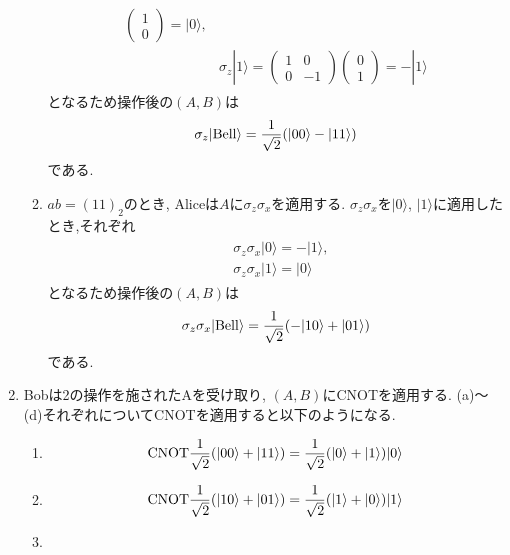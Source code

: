 \documentclass[uplatex,a4j,11pt,dvipdfmx]{jsarticle}
\begin{document}
\begin{enumerate}
\begin{enumerate}
\begin{align}
\begin{split}
\begin{pmatrix}
          1\\0
        \end{pmatrix}=|0\rangle,\\
        &\sigma_z|1\rangle=\begin{pmatrix}
          1&0\\0&-1
        \end{pmatrix}\begin{pmatrix}
          0\\1
        \end{pmatrix}=-|1\rangle
      \end{split}
    \end{align}
    となるため操作後の$(A,B)$は
    \begin{align}
      \sigma_z|{\rm Bell}\rangle=\frac{1}{\sqrt{2}}(|00\rangle-|11\rangle)
    \end{align}
    である.
    \item $ab=(11)_2$のとき, Aliceは$A$に$\sigma_z\sigma_x$を適用する.
    $\sigma_z\sigma_x$を$|0\rangle$, $|1\rangle$に適用したとき,それぞれ
    \begin{align}
      \begin{split}
        &\sigma_z\sigma_x|0\rangle=-|1\rangle,\\
        &\sigma_z\sigma_x|1\rangle=|0\rangle
      \end{split}
    \end{align}
    となるため操作後の$(A,B)$は
    \begin{align}
      \sigma_z\sigma_x|{\rm Bell}\rangle=\frac{1}{\sqrt{2}}(-|10\rangle+|01\rangle)
    \end{align}
    である.
  \end{enumerate}
  \item Bobは2の操作を施されたAを受け取り, $(A,B)$にCNOTを適用する.
  (a)〜(d)それぞれについてCNOTを適用すると以下のようになる.
  \begin{enumerate}
    \item \begin{align}
      {\rm CNOT}\frac{1}{\sqrt{2}}(|00\rangle+|11\rangle)=\frac{1}{\sqrt{2}}(|0\rangle+|1\rangle)|0\rangle
    \end{align}
    \item \begin{align}
      {\rm CNOT}\frac{1}{\sqrt{2}}(|10\rangle+|01\rangle)=\frac{1}{\sqrt{2}}(|1\rangle+|0\rangle)|1\rangle
    \end{align}
    \item \begin{align}

\end{align}
\end{enumerate}
\end{enumerate}
\end{document}
